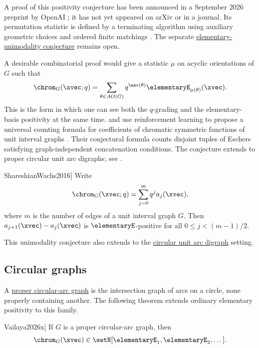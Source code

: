 A proof of this positivity conjecture has been announced in a September 2026
preprint by OpenAI \cite[Thm.~1.1]{OpenAI2026ChromaticPositivity}; it has
not yet appeared on arXiv or in a journal.
Its permutation statistic is defined by a terminating algorithm using
auxiliary geometric choices and ordered finite matchings
\cite[Sec.~6]{OpenAI2026ChromaticPositivity}. The separate
\hyperref[chromaticEUnimodalityConjecture]{elementary-unimodality conjecture}
remains open.

A desirable combinatorial proof would give a statistic $\mu$ on acyclic
orientations of $G$ such that
\[
\chrom_G(\xvec;q)
= \sum_{\theta \in AO(G)} q^{\asc(\theta)}
\elementaryE_{\mu(\theta)}(\xvec).
\]
This is the form in which one can see both the $q$-grading and the
elementary-basis positivity at the same time.
 and
 use reinforcement learning to propose
a universal counting formula for coefficients of chromatic symmetric
functions of unit interval graphs \cite{BercziKluver2024x}.  Their
conjectural formula counts disjoint tuples of Eschers satisfying
graph-independent concatenation conditions.
The conjecture extends to proper circular unit arc digraphs; see
\cite{Ellzey2017,AlexanderssonPanova2018}.

\begin{conjecture}[See \cite[Conj.~5.1]{ShareshianWachs2016}]
\label{chromaticEUnimodalityConjecture}
Write
\[
\chrom_G(\xvec;q) = \sum_{j=0}^m q^j a_j(\xvec),
\]
where $m$ is the number of edges of a unit interval graph $G$.
Then $a_{j+1}(\xvec)-a_j(\xvec)$ is $\elementaryE$-positive for
all $0 \leq j \lt (m-1)/2$.
\end{conjecture}

This unimodality conjecture also extends to the
\hyperref[circularUnitArcDigraph]{circular unit arc digraph} setting.

\subsection[chromaticECircularPositivity]{Circular graphs}

A \hyperref[properCircularArcGraph]{proper circular-arc graph} is the
intersection graph of arcs on a circle, none properly containing another.
The following theorem extends ordinary elementary positivity to this family.

\begin{theorem}[Vailaya, \cite[Thm.~21]{Vailaya2026x}]
\label{chromaticECircularTheorem}
If $G$ is a proper circular-arc graph, then
\[
 \chrom_G(\xvec)\in\setN[\elementaryE_1,\elementaryE_2,\dotsc].
\]
\end{theorem}

